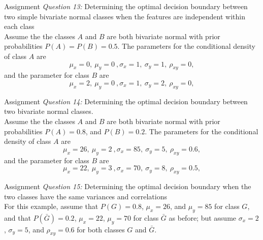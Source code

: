 \begin{frame}{Assignment}
\textit{\color{slidecolor}Question 13:} {\color{slidecolor}Determining the optimal decision boundary between two simple bivariate normal classes when the features are independent within each class}\\
Assume the the classes $A$ and $B$ are both bivariate normal with prior probabilities $P(A)=P(B)=0.5$. The parameters for the conditional density of class $A$ are
\begin{equation}
\mu_x=0,~\mu_y=0~,\sigma_x=1,~\sigma_y=1,~\rho_{xy}=0,\nonumber
\end{equation}
and the parameter for class $B$ are
\begin{equation}
\mu_x=2,~\mu_y=0~,\sigma_x=1,~\sigma_y=2,~\rho_{xy}=0,\nonumber
\end{equation}
\end{frame}

\begin{frame}{Assignment}
\textit{\color{slidecolor}Question 14:} {\color{slidecolor}Determining the optimal decision boundary between two bivariate normal classes.}\\
Assume the the classes $A$ and $B$ are both bivariate normal with prior probabilities $P(A)=0.8$, and $P(B)=0.2$. The parameters for the conditional density of class $A$ are
\begin{equation}
\mu_x=26,~\mu_y=2~,\sigma_x=85,~\sigma_y=5,~\rho_{xy}=0.6,\nonumber
\end{equation}
and the parameter for class $B$ are
\begin{equation}
\mu_x=22,~\mu_y=3~,\sigma_x=70,~\sigma_y=8,~\rho_{xy}=0.5,\nonumber
\end{equation}
\end{frame}

\begin{frame}{Assignment}
\textit{\color{slidecolor}Question 15:} {\color{slidecolor}Determining the optimal decision boundary when the two classes have the same variances and correlations}\\
For this example, assume that $P(G)=0.8$, $\mu_x=26$, and $\mu_y=85$ for class $G$, and that $P(\bar{G})=0.2$, $\mu_x=22$, $\mu_y=70$ for class $\bar{G}$ as before; but assume $\sigma_x=2$, $\sigma_y=5$, and $\rho_{xy}=0.6$ for both classes $G$ and $\bar{G}$.
\end{frame}

